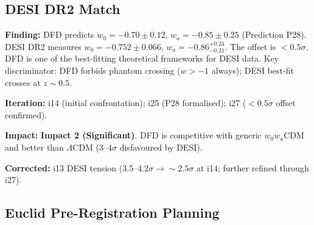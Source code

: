 \documentclass[11pt,a4paper]{article}
\newcommand{\imptwo}{\textcolor{impact2}{\textbf{Impact 2 (Significant)}}}
\begin{document}
\subsection{DESI DR2 Match}
\label{sec:desi}

\begin{tcolorbox}[colback=green!5!white, colframe=green!50!black,
  title=\textbf{DESI DR2 Dark Energy Match --- Iterations 14--27}]

\textbf{Finding:} DFD predicts $w_0 = -0.70 \pm 0.12$,
$w_a = -0.85 \pm 0.25$ (Prediction P28). DESI DR2 measures
$w_0 = -0.752 \pm 0.066$, $w_a = -0.86^{+0.24}_{-0.21}$. The offset
is $< 0.5\sigma$. DFD is one of the best-fitting theoretical frameworks
for DESI data. Key discriminator: DFD forbids phantom crossing
($w > -1$ always); DESI best-fit crosses at $z \sim 0.5$.

\textbf{Iteration:} i14 (initial confrontation); i25 (P28 formalised);
i27 ($< 0.5\sigma$ offset confirmed).

\textbf{Impact:} \imptwo. DFD is competitive with generic $w_0 w_a$CDM
and better than $\Lambda$CDM ($3$--$4\sigma$ disfavoured by DESI).

\textbf{Corrected:} i13 DESI tension (3.5--4.2$\sigma \to \sim 2.5\sigma$
at i14; further refined through i27).

\end{tcolorbox}

\subsection{Euclid Pre-Registration Planning}
\label{sec:euclid}
\end{document}
